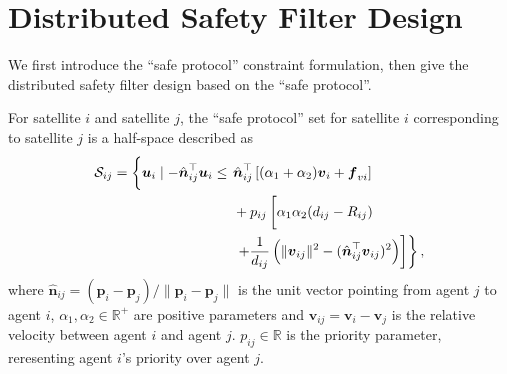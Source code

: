 \documentclass{ifacconf}
\begin{document}
\section{Distributed Safety Filter Design}\label{sec:filterDesign}
\par We first introduce the ``safe protocol'' constraint formulation, then give the distributed safety filter design based on the ``safe protocol''. 

\par For satellite $i$ and satellite $j$, the ``safe protocol'' set for satellite $i$ corresponding to satellite $j$ is a half-space described as
\begin{equation} \label{eqn:safeProtocol}
   \begin{aligned}
      \mathcal{S}_{ij} = \left\{ \boldsymbol{u}_i \mid -\hat{\boldsymbol{n}}_{ij}^\top \boldsymbol{u}_i \le \vphantom{\frac{1}{d_{ij}}} \right. 
      & \hat{\boldsymbol{n}}_{ij}^{\top} \left[(\alpha_1 + \alpha_2)\boldsymbol{v}_i + \boldsymbol{f}_{vi} \right] \\
      &+ p_{ij} \left[ \alpha_1 \alpha_2 (d_{ij} - R_{ij}) \vphantom{\frac{1}{d_{ij}}} \right. \\
      & \left. \left. + \frac{1}{d_{ij}}\left( \|\boldsymbol{v}_{ij}\|^2 - ( \hat{\boldsymbol{n}}_{ij}^{\top}\boldsymbol{v}_{ij} )^2 \right) \right] \right\},
   \end{aligned}
\end{equation}
where $\hat{\boldsymbol{n}}_{ij} = (\boldsymbol{p}_i - \boldsymbol{p}_j)/\| \boldsymbol{p}_i - \boldsymbol{p}_j \|$ is the unit vector pointing from agent $j$ to agent $i$, 
$\alpha_1, \alpha_2 \in \mathbb{R}^{+}$ are positive parameters and 
$\boldsymbol{v}_{ij} = \boldsymbol{v}_i - \boldsymbol{v}_j$ is the relative velocity between agent $i$ and agent $j$.
$p_{ij} \in \mathbb{R}$ is the priority parameter, reresenting agent $i$'s priority over agent $j$. 
\end{document}
